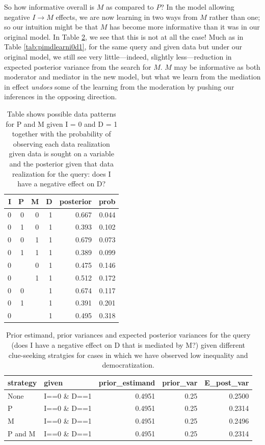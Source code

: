 \documentclass[
  12pt,
]{book}
\begin{document}
So how informative overall is \(M\) as compared to \(P\)? In the model allowing negative \(I \rightarrow M\) effects, we are now learning in two ways from \(M\) rather than one; so our intuition might be that \(M\) has become more informative than it was in our original model. In Table \ref{tab:pimdlearnpriorseffect}, we see that this is not at all the case! Much as in Table \ref{tab:pimdlearni0d1}, for the same query and given data but under our original model, we still see very little---indeed, slightly less---reduction in expected posterior variance from the search for \(M\). \(M\) may be informative as both moderator and mediator in the new model, but what we learn from the mediation in effect \emph{undoes} some of the learning from the moderation by pushing our inferences in the opposing direction.

\begin{table}

\caption{\label{tab:pimdposs}Table shows possible data patterns for P and M given I = 0 and D = 1 together with the probability of observing each data realization given data is sought on a variable and the posterior given that data realization for the query: does I have a negative effect on D?}
\centering
\begin{tabular}[t]{r|r|r|r|r|r}
\hline
I & P & M & D & posterior & prob\\
\hline
0 & 0 & 0 & 1 & 0.667 & 0.044\\
\hline
0 & 1 & 0 & 1 & 0.393 & 0.102\\
\hline
0 & 0 & 1 & 1 & 0.679 & 0.073\\
\hline
0 & 1 & 1 & 1 & 0.389 & 0.099\\
\hline
0 &  & 0 & 1 & 0.475 & 0.146\\
\hline
0 &  & 1 & 1 & 0.512 & 0.172\\
\hline
0 & 0 &  & 1 & 0.674 & 0.117\\
\hline
0 & 1 &  & 1 & 0.391 & 0.201\\
\hline
0 &  &  & 1 & 0.495 & 0.318\\
\hline
\end{tabular}
\end{table}

\begin{table}

\caption{\label{tab:pimdlearnpriorseffect}Prior estimand, prior variances and expected posterior variances for the query (does I have a negative effect on D that is mediated by M?) given different  clue-seeking  stratgies for cases in which we have observed low inequality and democratization.}
\centering
\begin{tabular}[t]{l|l|r|r|r}
\hline
strategy & given & prior\_estimand & prior\_var & E\_post\_var\\
\hline
None & I==0 \& D==1 & 0.4951 & 0.25 & 0.2500\\
\hline
P & I==0 \& D==1 & 0.4951 & 0.25 & 0.2314\\
\hline
M & I==0 \& D==1 & 0.4951 & 0.25 & 0.2496\\
\hline
P and M & I==0 \& D==1 & 0.4951 & 0.25 & 0.2314\\
\hline
\end{tabular}
\end{table}
\end{document}
